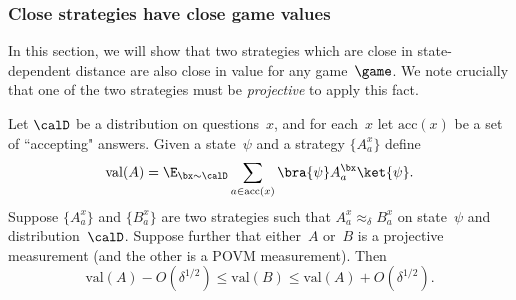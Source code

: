 \subsubsection{Close strategies have close game values}

In this section, we will show that two strategies which are close in state-dependent distance are also close in value for any game~$\game$.
We note crucially that one of the two strategies must be \emph{projective} to apply this fact.

\begin{fact}\label{fact:approx-delta-generalized-game-value}
Let $\calD$ be a distribution on questions~$x$, and for each~$x$ let $\mathrm{acc}(x)$ be a set of ``accepting" answers.
Given a state~$\psi$ and a strategy $\{A^x_a\}$ define
\begin{equation*}
\mathrm{val}(A) = \E_{\bx \sim \calD} \sum_{a \in \mathrm{acc}(x)} \bra{\psi} A^{\bx}_a \ket{\psi}.
\end{equation*}
Suppose $\{A^x_a\}$ and $\{B^x_a\}$ are two strategies such that $A^x_a \approx_\delta B^x_a$ on state~$\psi$ and distribution~$\calD$.
Suppose further that either~$A$ or~$B$ is a projective measurement (and the other is a POVM measurement).
Then
\begin{equation*}
\mathrm{val}(A) - O(\delta^{1/2}) \leq \mathrm{val}(B) \leq \mathrm{val}(A) + O(\delta^{1/2}).
\end{equation*}
\end{fact}
